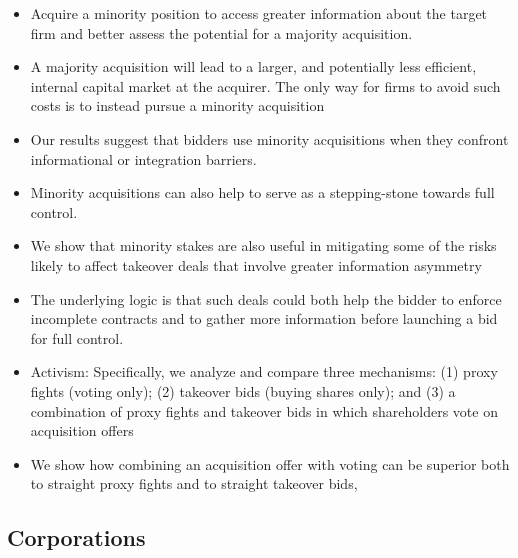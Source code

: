 \documentclass[12pt]{article}
\begin{document}
\begin{itemize}
    \item Acquire a minority position to access greater information about the target firm and better assess the potential for a majority acquisition. \citep{Ouimet2013}

    \item A majority acquisition will lead to a larger, and potentially less efficient, internal capital market at the acquirer. The only way for firms to avoid such costs is to instead pursue a minority acquisition \citep{Ouimet2013}

    \item Our results suggest that bidders use minority acquisitions when they confront informational or integration barriers. \citep{huang}

    \item Minority acquisitions can also help to serve as a stepping-stone towards full control. \citep{huang}

    \item We show that minority stakes are also useful in mitigating some of the risks likely to affect takeover deals that involve greater information asymmetry \citep{huang}

    \item The underlying logic is that such deals could both help the bidder to enforce incomplete contracts and to gather more information before launching a bid for full control. \citep{huang}

    \item Activism: Specifically, we analyze and compare three mechanisms: (1) proxy fights (voting only); (2) takeover bids (buying shares only); and (3) a combination of proxy fights and takeover bids in which shareholders vote on acquisition offers \citep{Arlen2001}

    \item We show how combining an acquisition offer with voting can be superior both to straight proxy fights and to straight takeover bids, \citep{Arlen2001}
\end{itemize}
\subsection{Corporations}
\end{document}
